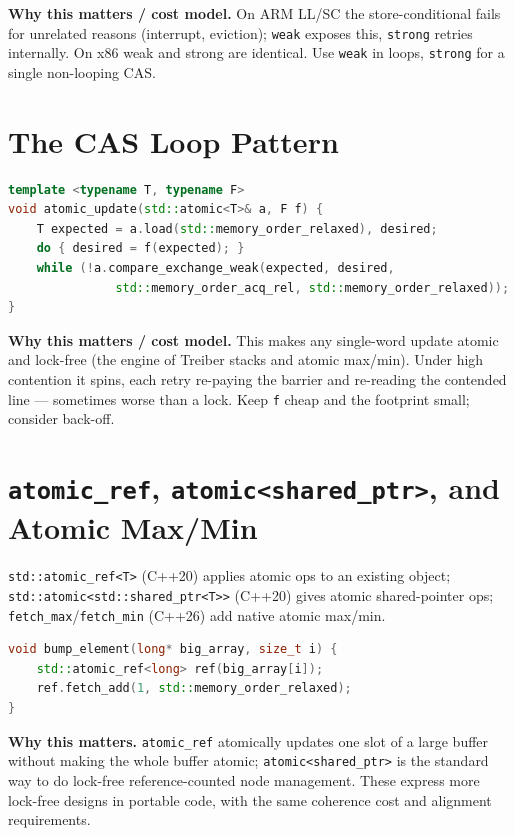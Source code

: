 \textbf{Why this matters / cost model.} On ARM LL/SC the store-conditional fails for unrelated reasons (interrupt, eviction); \texttt{weak} exposes this, \texttt{strong} retries internally. On x86 weak and strong are identical. Use \texttt{weak} in loops, \texttt{strong} for a single non-looping CAS.

\section{The CAS Loop Pattern}
\begin{lstlisting}[language=C++, caption={The canonical CAS loop; f is recomputed each retry. Min standard: C++11.}]
template <typename T, typename F>
void atomic_update(std::atomic<T>& a, F f) {
    T expected = a.load(std::memory_order_relaxed), desired;
    do { desired = f(expected); }
    while (!a.compare_exchange_weak(expected, desired,
               std::memory_order_acq_rel, std::memory_order_relaxed));
}
\end{lstlisting}

\textbf{Why this matters / cost model.} This makes any single-word update atomic and lock-free (the engine of Treiber stacks and atomic max/min). Under high contention it spins, each retry re-paying the barrier and re-reading the contended line --- sometimes worse than a lock. Keep \texttt{f} cheap and the footprint small; consider back-off.

\section{\texttt{atomic\_ref}, \texttt{atomic<shared\_ptr>}, and Atomic Max/Min}
\texttt{std::atomic\_ref<T>} (C++20) applies atomic ops to an existing object; \texttt{std::atomic<std::shared\_ptr<T>>} (C++20) gives atomic shared-pointer ops; \texttt{fetch\_max}/\texttt{fetch\_min} (C++26) add native atomic max/min.

\begin{lstlisting}[language=C++, caption={atomic_ref updates one element of a plain array. Min standard: C++20.}]
void bump_element(long* big_array, size_t i) {
    std::atomic_ref<long> ref(big_array[i]);
    ref.fetch_add(1, std::memory_order_relaxed);
}
\end{lstlisting}

\textbf{Why this matters.} \texttt{atomic\_ref} atomically updates one slot of a large buffer without making the whole buffer atomic; \texttt{atomic<shared\_ptr>} is the standard way to do lock-free reference-counted node management. These express more lock-free designs in portable code, with the same coherence cost and alignment requirements.

